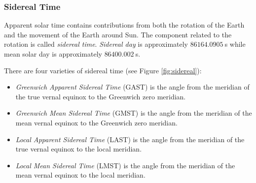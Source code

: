 \documentclass [12pt, a4paper] {article}
\begin{document}
\subsubsection{Sidereal Time}
Apparent solar time contains contributions from both the rotation of the Earth and the
movement of the Earth around Sun. The component related to the rotation is called 
\emph{sidereal time}. \emph{Sidereal day} is approximately $86164.0905\:$s while mean solar
day is approximately $86400.002\:$s.

There are four varieties of sidereal time (see Figure \ref{fig:sidereal}): 
\begin {itemize}
  \item \emph{Greenwich Apparent Sidereal Time} (GAST) is the angle from the meridian 
  of the true vernal equinox to the Greenwich zero meridian.
  \item \emph{Greenwich Mean Sidereal Time} (GMST) is the angle from the meridian 
  of the mean vernal equinox to the Greenwich zero meridian.
  \item \emph{Local Apparent Sidereal Time} (LAST) is the angle from the meridian of 
  the true vernal equinox to the local meridian.
  \item \emph{Local Mean Sidereal Time} (LMST) is the angle from the meridian of the 
  mean vernal equinox to the local meridian. 
\end {itemize}
\end{document}

